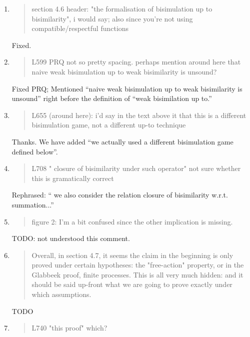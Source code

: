\begin{enumerate}
\item \begin{quote}
    section 4.6 header: "the formalisation of bisimulation up to
    bisimilarity", i would say; also since you're not using
    compatible/respectful functions
  \end{quote}
  Fixed.
  
\item \begin{quote}
    L599 PRQ not so pretty spacing. perhaps mention around here that
    naive weak bisimulation up to weak bisimilarity is unsound?
  \end{quote}
  Fixed PRQ; Mentioned ``naive weak bisimulation up to weak
  bisimilarity is unsound'' right before the definition of ``weak
  bisimilation up to.''
  
\item \begin{quote}
    L655 (around here): i'd say in the text above it that this is a
    different bisimulation game, not a different up-to technique
  \end{quote}
  Thanks. We have added ``we actually used a different bisimulation game defined below''.

\item \begin{quote}
    L708 " closure of bisimilarity under such operator" not sure whether this is gramatically correct
  \end{quote}
  Rephrased: `` we also consider the relation closure of bisimilarity
  w.r.t. summation...''

\item \begin{quote}
    figure 2: I'm a bit confused since the other implication is missing. 
  \end{quote}

  TODO: not understood this comment.
  
\item \begin{quote}
    Overall, in section 4.7, it seems the claim in the beginning is
    only proved under certain hypotheses: the "free-action" property,
    or in the Glabbeek proof, finite processes. This is all very much
    hidden: and it should be said up-front what we are going to prove
    exactly under which assumptions.
  \end{quote}

  TODO
  
\item \begin{quote}
    L740 "this proof" which? 
  \end{quote}


\end{enumerate}
